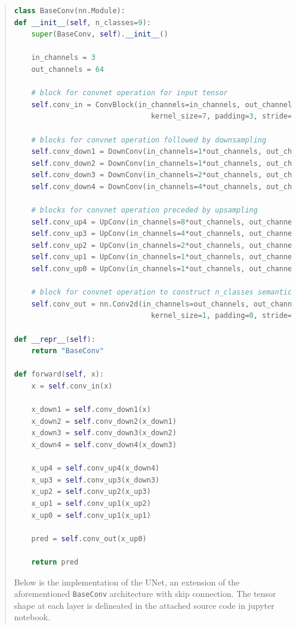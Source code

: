 \documentclass[9pt]{article}
\begin{document}
\begin{quote}
\begin{lstlisting}[language=Python, basicstyle=\scriptsize]
class BaseConv(nn.Module):
def __init__(self, n_classes=9):
    super(BaseConv, self).__init__()

    in_channels = 3
    out_channels = 64

    # block for convnet operation for input tensor
    self.conv_in = ConvBlock(in_channels=in_channels, out_channels=out_channels, 
                                kernel_size=7, padding=3, stride=2)

    # blocks for convnet operation followed by downsampling
    self.conv_down1 = DownConv(in_channels=1*out_channels, out_channels=1*out_channels)
    self.conv_down2 = DownConv(in_channels=1*out_channels, out_channels=2*out_channels)
    self.conv_down3 = DownConv(in_channels=2*out_channels, out_channels=4*out_channels)
    self.conv_down4 = DownConv(in_channels=4*out_channels, out_channels=8*out_channels)

    # blocks for convnet operation preceded by upsampling
    self.conv_up4 = UpConv(in_channels=8*out_channels, out_channels=4*out_channels)
    self.conv_up3 = UpConv(in_channels=4*out_channels, out_channels=2*out_channels)
    self.conv_up2 = UpConv(in_channels=2*out_channels, out_channels=1*out_channels)
    self.conv_up1 = UpConv(in_channels=1*out_channels, out_channels=1*out_channels)
    self.conv_up0 = UpConv(in_channels=1*out_channels, out_channels=1*out_channels)
    
    # block for convnet operation to construct n_classes semantic outputs
    self.conv_out = nn.Conv2d(in_channels=out_channels, out_channels=n_classes, 
                                kernel_size=1, padding=0, stride=1)

def __repr__(self):
    return "BaseConv"
    
def forward(self, x):
    x = self.conv_in(x)
    
    x_down1 = self.conv_down1(x)
    x_down2 = self.conv_down2(x_down1)
    x_down3 = self.conv_down3(x_down2)
    x_down4 = self.conv_down4(x_down3)
    
    x_up4 = self.conv_up4(x_down4)
    x_up3 = self.conv_up3(x_down3)
    x_up2 = self.conv_up2(x_up3)
    x_up1 = self.conv_up1(x_up2)
    x_up0 = self.conv_up1(x_up1)

    pred = self.conv_out(x_up0)

    return pred
\end{lstlisting}

Below is the implementation of the UNet, an extension of the aforementioned \texttt{BaseConv} architecture with skip connection. The tensor shape at each layer is delineated in the attached source code in jupyter notebook.


\end{quote}
\end{document}

